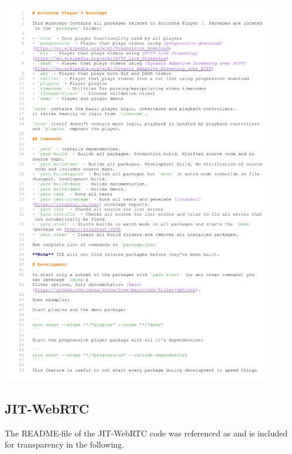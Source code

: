 \documentclass[../MasterThesis.tex]{subfiles}
\begin{document}
\includegraphics[page=2, width=0.9\textwidth]{FE.pdf}



\newpage
\subsection{JIT-WebRTC} \label{appendix:readmejitwebrtc}

The README-file of the JIT-WebRTC code was referenced as \cite{RM_Backend} and is included for transparency in the following.
\end{document}
